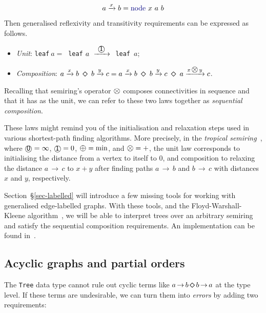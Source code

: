 \documentclass[english,submission]{programming}
\newcommand{\hcode}[1]{{\color{darkblue} \lstinline[keywordstyle={}]|#1|}} %
\newcommand{\add}{\text{\raisebox{-0.1mm}{\large $\oplus$}}}
\newcommand{\mul}{\text{\raisebox{-0.1mm}{\large $\otimes$}}}
\newcommand{\zero}{\raisebox{-0.2mm}{\textcircled{\textsf{0}}}\xspace}
\newcommand{\one}{\raisebox{-0.2mm}{\textcircled{\textsf{\hspace{-0.2mm}1}}}\xspace}
\newcommand{\dia}{\,\text{\raisebox{-0.3mm}{\Large $\diamond$}}\,}
\newcommand{\arr}{\,\text{$\rightarrow$}\,}
\begin{document}
\vspace{-5mm}
\begin{equation*}
a \xrightarrow{x} b = \text{\hcode{node}}\ x\ a\ b
\end{equation*}
\vspace{-5mm}

\noindent
Then generalised reflexivity and transitivity requirements can be expressed as follows.

\begin{itemize}
    \item \emph{Unit}:
    \hcode{leaf}$~a =~$\hcode{leaf}$~a\ \xrightarrow{\ \one\ }\ $\hcode{leaf}~$a$;
    \item \emph{Composition}:
    $a \xrightarrow{x} b\ \dia\ b \xrightarrow{y} c = a \xrightarrow{x} b\ \dia\ b \xrightarrow{y} c\ \dia\ a \xrightarrow{x\,\mul\,y} c$.
\end{itemize}

\noindent
Recalling that semiring's operator $\mul$ composes connectivities in
sequence and that it has \one as the unit, we can refer to these two laws
together as \emph{sequential composition}.

These laws might remind you of the initialisation and relaxation steps used in
various shortest-path finding algorithms. More precisely, in the
\emph{tropical semiring}~\cite{mohri2002semiring}, where $\zero = \infty$,
$\one = 0$, $\add = \min$, and $\mul = +$, the unit law corresponds to
initialising the distance from a vertex to itself to $0$, and composition to
relaxing the distance $a \arr c$ to $x + y$ after finding paths $a \arr b$ and
$b \arr c$ with distances $x$ and $y$, respectively.

Section~\S\ref{sec-labelled} will introduce a few missing tools for working with
generalised edge-labelled graphs. With these tools, and the Floyd-Warshall-Kleene
algorithm~\cite{hopcroft_ullman}\cite{kleene1951representation}, we will be able
to interpret trees over an arbitrary semiring and satisfy the sequential
composition requirements. An implementation can be found
in~\cite{alga_haskell}.

\subsection{Acyclic graphs and partial orders}\label{sec-acyclic-graphs}
\vspace{-1mm}

The \hcode{Tree} data type cannot rule out cyclic terms like
$a \arr b \dia b \arr a$ at the type level. If these terms are undesirable, we
can turn them into \emph{errors} by adding two requirements:
\end{document}
